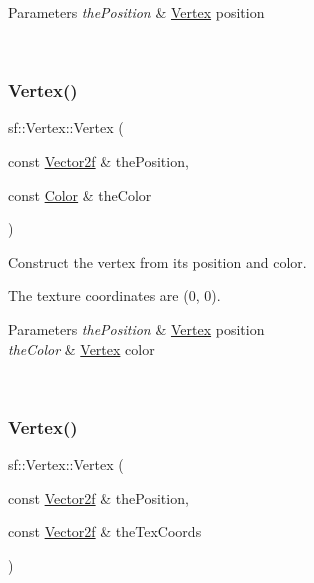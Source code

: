 \begin{DoxyParams}{Parameters}
{\em the\+Position} & \mbox{\hyperlink{classsf_1_1_vertex}{Vertex}} position \begin{DoxyVerb}\end{DoxyVerb}
 \\
\hline
\end{DoxyParams}
\mbox{\label{classsf_1_1_vertex_a70b0679b4ec531d5bd1a7d0225c7321a}} 
\subsubsection{\texorpdfstring{Vertex()}{Vertex()}\hspace{0.1cm}{\footnotesize\ttfamily [3/5]}}
{\footnotesize\ttfamily sf\+::\+Vertex\+::\+Vertex (\begin{DoxyParamCaption}\item[{const \mbox{\hyperlink{classsf_1_1_vector2}{Vector2f}} \&}]{the\+Position,  }\item[{const \mbox{\hyperlink{classsf_1_1_color}{Color}} \&}]{the\+Color }\end{DoxyParamCaption})}



Construct the vertex from its position and color. 

The texture coordinates are (0, 0).


\begin{DoxyParams}{Parameters}
{\em the\+Position} & \mbox{\hyperlink{classsf_1_1_vertex}{Vertex}} position \\
\hline
{\em the\+Color} & \mbox{\hyperlink{classsf_1_1_vertex}{Vertex}} color \begin{DoxyVerb}\end{DoxyVerb}
 \\
\hline
\end{DoxyParams}
\mbox{\label{classsf_1_1_vertex_ab9bf849c4c0d82d09bf5bece23d2456a}} 
\subsubsection{\texorpdfstring{Vertex()}{Vertex()}\hspace{0.1cm}{\footnotesize\ttfamily [4/5]}}
{\footnotesize\ttfamily sf\+::\+Vertex\+::\+Vertex (\begin{DoxyParamCaption}\item[{const \mbox{\hyperlink{classsf_1_1_vector2}{Vector2f}} \&}]{the\+Position,  }\item[{const \mbox{\hyperlink{classsf_1_1_vector2}{Vector2f}} \&}]{the\+Tex\+Coords }\end{DoxyParamCaption})}




